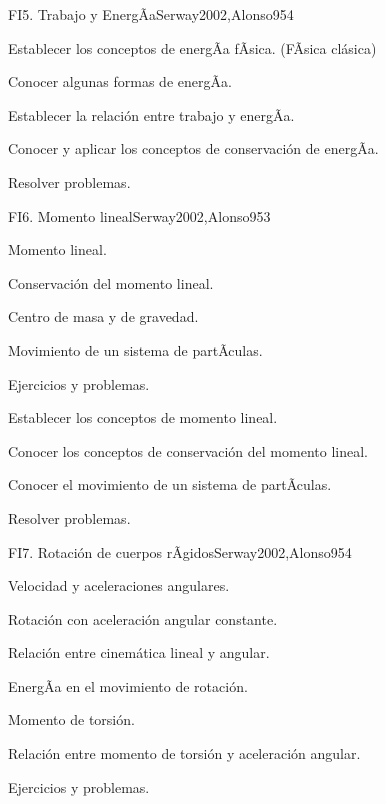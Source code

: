 \begin{syllabus}
\begin{unit}{FI5. Trabajo y EnergÃ­a}{Serway2002,Alonso95}{4}
   \begin{unitgoals}
      \item Establecer los conceptos de energÃ­a fÃ­sica. (FÃ­sica clásica)
      \item Conocer algunas formas de energÃ­a.
      \item Establecer la relación entre trabajo y energÃ­a.
      \item Conocer y aplicar los conceptos de conservación de energÃ­a.
      \item Resolver problemas.
   \end{unitgoals}
\end{unit}

\begin{unit}{FI6. Momento lineal}{Serway2002,Alonso95}{3}
\begin{topics}
      \item Momento lineal.
      \item Conservación del momento lineal.
      \item Centro de masa y de gravedad.
      \item Movimiento de un sistema de partÃ­culas.
      \item Ejercicios y problemas.
  \end{topics}

   \begin{unitgoals}
      \item Establecer los conceptos de momento lineal.
      \item Conocer los conceptos de conservación del momento lineal.
      \item Conocer el movimiento de un sistema de partÃ­culas.
      \item Resolver problemas.
   \end{unitgoals}
\end{unit}

\begin{unit}{FI7. Rotación de cuerpos rÃ­gidos}{Serway2002,Alonso95}{4}
\begin{topics}
      \item Velocidad y aceleraciones angulares.
      \item Rotación con aceleración angular constante.
      \item Relación entre cinemática lineal y angular.
      \item EnergÃ­a en el movimiento de rotación.
      \item Momento de torsión.
      \item Relación entre momento de torsión y aceleración angular.
      \item Ejercicios y problemas.
   \end{topics}


\end{unit}
\end{syllabus}
